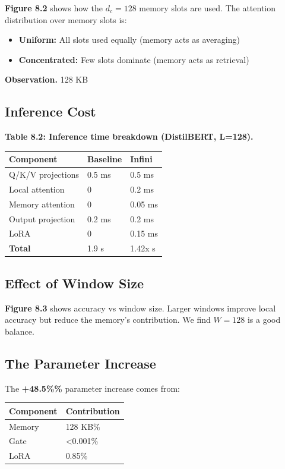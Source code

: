 \textbf{Figure 8.2} shows how the $d_c = 128$ memory slots are used. The 
attention distribution over memory slots is:

\begin{itemize}
\item \textbf{Uniform:} All slots used equally (memory acts as averaging)
\item \textbf{Concentrated:} Few slots dominate (memory acts as retrieval)

\end{itemize}
\textbf{Observation.} 128 KB

\subsection{Inference Cost}

\textbf{Table 8.2: Inference time breakdown (DistilBERT, L=128).}

\begin{table}[H]
\centering
\small
\begin{tabular}{lll}
\toprule
\textbf{Component} & \textbf{Baseline} & \textbf{Infini} \\
\midrule
Q/K/V projections & 0.5 ms & 0.5 ms \\
Local attention & 0 & 0.2 ms \\
Memory attention & 0 & 0.05 ms \\
Output projection & 0.2 ms & 0.2 ms \\
LoRA & 0 & 0.15 ms \\
\textbf{Total} & 1.9 s & 1.42x s \\
\bottomrule
\end{tabular}
\end{table}

\subsection{Effect of Window Size}

\textbf{Figure 8.3} shows accuracy vs window size. Larger windows improve 
local accuracy but reduce the memory's contribution. We find $W = 128$ 
is a good balance.

\subsection{The Parameter Increase}

The \textbf{+48.5\%\%} parameter increase comes from:

\begin{table}[H]
\centering
\small
\begin{tabular}{ll}
\toprule
\textbf{Component} & \textbf{Contribution} \\
\midrule
Memory & 128 KB\% \\
Gate & \textless{}0.001\% \\
LoRA & 0.85\% \\
\bottomrule
\end{tabular}
\end{table}

